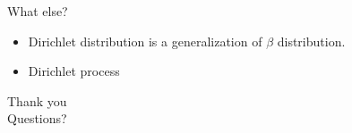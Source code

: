 \documentclass[handout]{beamer}
\begin{document}


\begin{frame}{What else?}
    \begin{itemize}
        \item Dirichlet distribution is a generalization of $\beta$ distribution.
        \item Dirichlet process
    \end{itemize}
\end{frame}

\begin{frame}
\huge{Thank you}\\
\huge{Questions?}\\
\end{frame}
\end{document}
